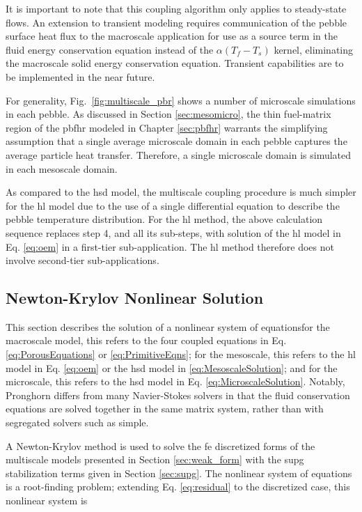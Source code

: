 It is important to note that this coupling algorithm only applies to steady-state flows. An extension to transient modeling requires communication of the pebble surface heat flux to the macroscale application for use as a source term in the fluid energy conservation equation instead of the \(\alpha(T_f-T_s)\) kernel, eliminating the macroscale solid energy conservation equation. Transient capabilities are to be implemented in the near future. 

For generality, Fig.\ \ref{fig:multiscale_pbr} shows a number of microscale simulations in each pebble. As discussed in Section \ref{sec:mesomicro}, the thin fuel-matrix region of the \gls{pbfhr} modeled in Chapter \ref{sec:pbfhr} warrants the simplifying assumption that a single average microscale domain in each pebble captures the average particle heat transfer. Therefore, a single microscale domain is simulated in each mesoscale domain.

As compared to the \gls{hsd} model, the multiscale coupling procedure is much simpler for the \gls{hl} model due to the use of a single differential equation to describe the pebble temperature distribution. For the \gls{hl} method, the above calculation sequence replaces step 4, and all its sub-steps, with solution of the \gls{hl} model in Eq. \eqref{eq:oem} in a first-tier sub-application. The \gls{hl} method therefore does not involve second-tier sub-applications. 

\subsection{Newton-Krylov Nonlinear Solution}
\label{sec:nonlinear}

This section describes the solution of a nonlinear system of equations\mdash for the macroscale model, this refers to the four coupled equations in Eq. \eqref{eq:PorousEquations} or \eqref{eq:PrimitiveEqns}; for the mesoscale, this refers to the \gls{hl} model in Eq. \eqref{eq:oem} or the \gls{hsd} model in \eqref{eq:MesoscaleSolution}; and for the microscale, this refers to the \gls{hsd} model in Eq. \eqref{eq:MicroscaleSolution}. Notably, Pronghorn differs from many Navier-Stokes solvers in that the fluid conservation equations are solved together in the same matrix system, rather than with segregated solvers such as \gls{simple}.

A Newton-Krylov method is used to solve the \gls{fe} discretized forms of the multiscale models presented in Section \ref{sec:weak_form} with the \gls{supg} stabilization terms given in Section \ref{sec:supg}. The nonlinear system of equations is a root-finding problem; extending Eq. \eqref{eq:residual} to the discretized case, this nonlinear system is

